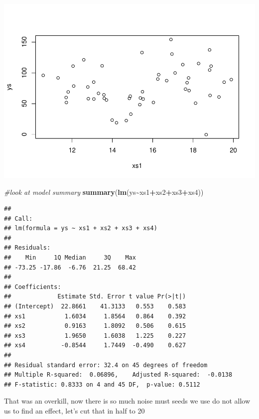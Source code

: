 \documentclass[
]{book}
\newenvironment{Shaded}{\begin{snugshade}}{\end{snugshade}}
\newcommand{\CommentTok}[1]{\textcolor[rgb]{0.56,0.35,0.01}{\textit{#1}}}
\newcommand{\FunctionTok}[1]{\textcolor[rgb]{0.13,0.29,0.53}{\textbf{#1}}}
\newcommand{\NormalTok}[1]{#1}
\newcommand{\SpecialCharTok}[1]{\textcolor[rgb]{0.81,0.36,0.00}{\textbf{#1}}}
\begin{document}
\includegraphics{ECOMODbook_files/figure-latex/a7.5-1.pdf}

\begin{Shaded}
\begin{Highlighting}[]
\CommentTok{\#look at model summary}
\FunctionTok{summary}\NormalTok{(}\FunctionTok{lm}\NormalTok{(ys}\SpecialCharTok{\textasciitilde{}}\NormalTok{xs1}\SpecialCharTok{+}\NormalTok{xs2}\SpecialCharTok{+}\NormalTok{xs3}\SpecialCharTok{+}\NormalTok{xs4))}
\end{Highlighting}
\end{Shaded}

\begin{verbatim}
## 
## Call:
## lm(formula = ys ~ xs1 + xs2 + xs3 + xs4)
## 
## Residuals:
##    Min     1Q Median     3Q    Max 
## -73.25 -17.86  -6.76  21.25  68.42 
## 
## Coefficients:
##             Estimate Std. Error t value Pr(>|t|)
## (Intercept)  22.8661    41.3133   0.553    0.583
## xs1           1.6034     1.8564   0.864    0.392
## xs2           0.9163     1.8092   0.506    0.615
## xs3           1.9650     1.6038   1.225    0.227
## xs4          -0.8544     1.7449  -0.490    0.627
## 
## Residual standard error: 32.4 on 45 degrees of freedom
## Multiple R-squared:  0.06896,    Adjusted R-squared:  -0.0138 
## F-statistic: 0.8333 on 4 and 45 DF,  p-value: 0.5112
\end{verbatim}

That was an overkill, now there is so much noise must seeds we use do not allow us to find an effect, let's cut that in half to 20
\end{document}
